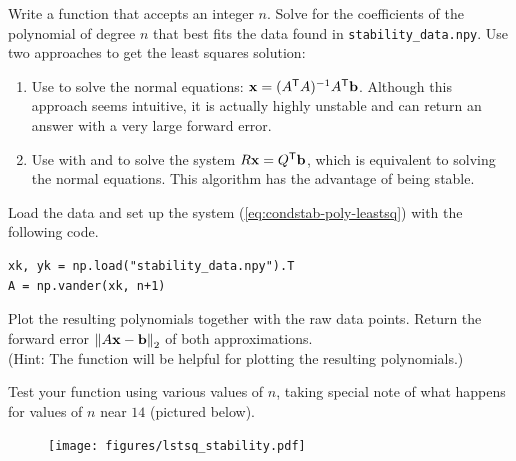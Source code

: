 \begin{problem}
Write a function that accepts an integer $n$.
Solve for the coefficients of the polynomial of degree $n$ that best fits the data found in \texttt{stability\_data.npy}.
Use two approaches to get the least squares solution:

\begin{enumerate}
\item Use  to solve the normal equations: $\mathbf{x} = (A^{\mathsf T} A)^{-1}A^{\mathsf T} \mathbf{b}$.
Although this approach seems intuitive, it is actually highly unstable and can return an answer with a very large forward error.

\item Use  with  and  to solve the system $R\mathbf{x} = Q^{\mathsf T}\mathbf{b}$, which is equivalent to solving the normal equations.
This algorithm has the advantage of being stable.
\end{enumerate}

Load the data and set up the system (\ref{eq:condstab-poly-leastsq}) with the following code.

\begin{lstlisting}
xk, yk = np.load("stability_data.npy").T
A = np.vander(xk, n+1)
\end{lstlisting}

Plot the resulting polynomials together with the raw data points.
Return the forward error $\left\lVert A\mathbf{x}-\mathbf{b}\right\rVert_2$ of both approximations.
\\(Hint: The function  will be helpful for plotting the resulting polynomials.)

Test your function using various values of $n$, taking special note of what happens for values of $n$ near $14$ (pictured below).

\begin{figure}[H]
    \centering
    \texttt{[image: figures/lstsq\_stability.pdf]}
\end{figure}
\end{problem}

